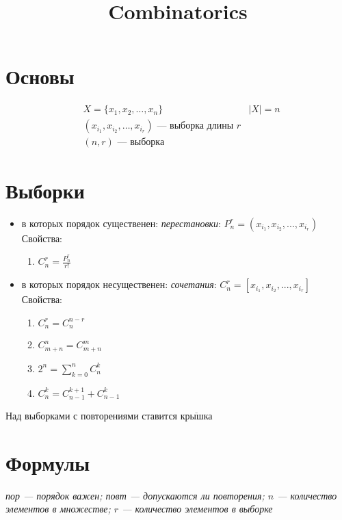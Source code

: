 \documentclass[12pt,a4paper, fleqn]{scrartcl} %
\begin{document}
\title{Combinatorics}
\maketitle
\section{Основы}
\label{sec:basics}

\begin{align}
&  X = \{x_1, x_2, \dots, x_n\} & |X| = n\\
&(x_{i_1}, x_{i_2}, \dots, x_{i_r})\text{ --- выборка длины } r\\
&(n, r) \text{ --- выборка}
\end{align}

\section{Выборки}

\begin{itemize}
\item в которых порядок существенен: \textit{перестановки}: $P_n^r = (x_{i_1}, x_{i_2}, ..., x_{i_r})$
  \\Свойства:
\begin{enumerate}
\item $C_n^r = \frac{P_n^r}{r!}$
\end{enumerate}
\item в которых порядок несущественен: \textit{сочетания}: $C_n^r = [x_{i_1}, x_{i_2}, ..., x_{i_r}]$
\\Свойства:
\begin{enumerate}
\item $C_n^r=C_n^{n-r}$
\item $C_{m+n}^n = C_{m+n}^m$
\item $2^n = \sum_{k=0}^n C_n^k $
\item $C_n^k = C_{n-1}^{k+1} + C_{n-1}^k$
\end{enumerate}
\end{itemize}

Над выборками с повторениями ставится $\overline{\text{крышка}}$

\section{Формулы}
{\scriptsize\slshape  \Info пор --- порядок важен; повт --- допускаются ли повторения; $n$ --- количество элементов в множестве; $r$ --- количество элементов в выборке}\\
\end{document}
